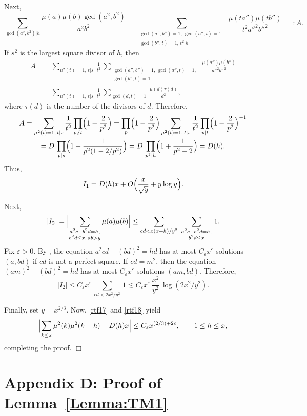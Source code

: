 \documentclass[11pt]{amsart}
\numberwithin{equation}{section}
\begin{document}
Next,
\[
\sum_{\gcd(a^2,b^2)|h}\frac{\mu(a)\mu(b)\gcd(a^2,b^2)}{a^2b^2}\, =
\sum_{\substack{\gcd(a'',b'')=1,\,\gcd(a'',t)=1,\\
\gcd(b'',t)=1,\,t^2|h}}\, \frac{\mu(ta'')\mu(tb'')}{t^2a''^2b''^2}\, =:A.
\]
If $s^2$ is the largest square divisor of $h$, then
\begin{align*}
A &= \sum_{\mu^2(t)=1,\, t|s}\, \frac1{t^2}\, \sum_{\substack{\gcd(a'',b'')=1,\, \gcd(a'',t)=1,\\
\gcd(b'',t)=1}}\, \frac{\mu(a'')\mu(b'')}{a''^2b''^2} \\
&= \sum_{\mu^2(t)=1,\, t|s}\, \frac1{t^2}\, \sum_{\gcd(d,t)=1}\, \frac{\mu(d)\tau(d)}{d^2},
\end{align*}
where $\tau(d)$ is the number of the divisors of $d$.
Therefore,
\begin{multline*}
A = \sum_{\mu^2(t)=1,\,t|s}\frac1{t^2}\prod_{p\,\centernot\mid \,t}\Bigl(1-\frac2{p^2}\Bigr)=
\prod_p\Bigl(1-\frac2{p^2}\Bigr)\sum_{\mu^2(t)=1,\,t|s}\frac1{t^2}\prod_{p|t}\Bigl(1-\frac2{p^2}\Bigr)^{-1}\\=
D\, \prod_{p|s}\Bigl(1+\frac1{p^2(1-2/p^2)}\Bigr)
=D\, \prod_{p^2 | h} \Bigl(1+\frac1{p^2-2} \Bigr)=D(h).
\end{multline*}
Thus,
\begin{equation}
I_1= D(h)x+O\Bigl(\frac{x}{\sqrt y}+y\log y\Bigr).
\label{rtf17}
\end{equation}

Next,
$$
|I_2|=\Bigl|\sum_{\substack{a^2c-b^2d=h,\\ b^2d\le x,\, ab>y}}\mu(a)\mu(b)\Bigr|\le
\sum_{cd<x(x+h)/y^2}\,\, \sum_{\substack{a^2c-b^2d=h,\\b^2d\le x}}\, 1.
$$
Fix $\varepsilon>0$. By \cite[Lemma 4]{CilGar}, the equation $a^2cd-(bd)^2=hd$ has at most $C_\varepsilon x^\varepsilon$ solutions $(a,bd)$ if
$cd$ is not a perfect square. If $cd=m^2$, then the equation $(am)^2-(bd)^2=hd$ has at most $C_\varepsilon x^\varepsilon$ solutions $(am,bd)$. Therefore,
\begin{equation}
|I_2|\le C_\varepsilon x^\varepsilon\, \sum_{cd<2x^2/y^2}\, 1
\lesssim C_\varepsilon x^\varepsilon\, \frac{x^2}{y^2}\,\log(2x^2/y^2).
\label{rtf18}
\end{equation}

Finally, set $y=x^{2/3}$. Now, \eqref{rtf17} and \eqref{rtf18} yield
$$
\Bigl|\sum_{k\le x}\mu^2(k) \mu^2(k+h)-D(h)x\Bigr|\le C_\varepsilon x^{(2/3)+2\varepsilon},
\qquad 1\le h\le x,
$$
completing the proof. \hfill $\Box$

\section*{Appendix D: Proof of Lemma~\ref{Lemma:TM1}}
\end{document}
